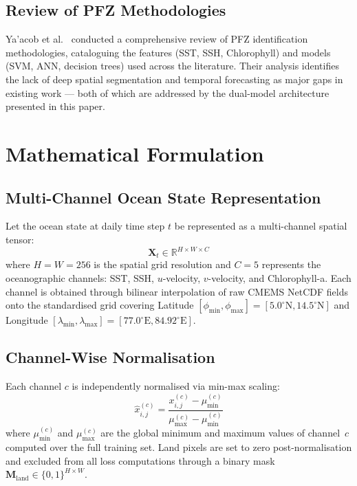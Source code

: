 \documentclass[conference]{IEEEtran}
\begin{document}
\subsection{Review of PFZ Methodologies}

Ya'acob et al.\ \cite{yaacob2024} conducted a comprehensive review of
PFZ identification methodologies, cataloguing the features (SST, SSH,
Chlorophyll) and models (SVM, ANN, decision trees) used across the
literature. Their analysis identifies the lack of deep spatial
segmentation and temporal forecasting as major gaps in existing work
--- both of which are addressed by the dual-model architecture
presented in this paper.

\section{Mathematical Formulation}

\subsection{Multi-Channel Ocean State Representation}

Let the ocean state at daily time step $t$ be represented as a
multi-channel spatial tensor:
\begin{equation}
\mathbf{X}_t \in \mathbb{R}^{H \times W \times C}
\label{eq:state}
\end{equation}
where $H = W = 256$ is the spatial grid resolution and $C = 5$
represents the oceanographic channels: SST, SSH, $u$-velocity,
$v$-velocity, and Chlorophyll-a. Each channel is obtained through
bilinear interpolation of raw CMEMS NetCDF fields onto the
standardised grid covering Latitude
$[\phi_{\min}, \phi_{\max}] = [5.0^\circ\text{N}, 14.5^\circ\text{N}]$
and Longitude
$[\lambda_{\min}, \lambda_{\max}] = [77.0^\circ\text{E}, 84.92^\circ\text{E}]$.

\subsection{Channel-Wise Normalisation}
Each channel $c$ is independently normalised via min-max scaling:
\begin{equation}
\hat{x}_{i,j}^{(c)} = \frac{x_{i,j}^{(c)} - \mu_{\min}^{(c)}}
                             {\mu_{\max}^{(c)} - \mu_{\min}^{(c)}}
\label{eq:normalise}
\end{equation}
where $\mu_{\min}^{(c)}$ and $\mu_{\max}^{(c)}$ are the global minimum
and maximum values of channel~$c$ computed over the full training set.
Land pixels are set to zero post-normalisation and excluded from all
loss computations through a binary mask
$\mathbf{M}_{\text{land}} \in \{0,1\}^{H \times W}$.
\end{document}
